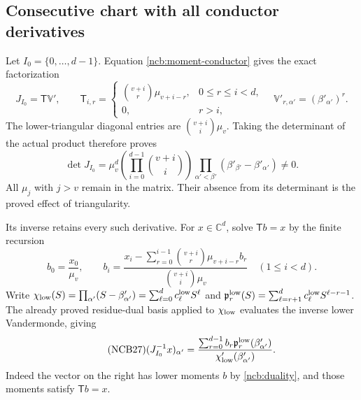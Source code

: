 \subsection{Consecutive chart with all conductor derivatives}
Let $I_0=\{0,\ldots,d-1\}$. Equation \eqref{ncb:moment-conductor}
gives the exact factorization
\begin{equation}\tag{NCB24}\label{ncb:triangular}
J_{I_0}=\mathsf T\mathbb V',\qquad
\mathsf T_{i,r}=
\begin{cases}\binom{v+i}{r}\mu_{v+i-r},&0\leq r\leq i<d,\\
0,&r>i,\end{cases}
\quad \mathbb V'_{r,\alpha'}=(\beta'_{\alpha'})^r .
\end{equation}
The lower-triangular diagonal entries are
$\binom{v+i}{i}\mu_v$. Taking the determinant of the actual product
therefore proves
\begin{equation}\tag{NCB25}\label{ncb:consecutive-det}
\det J_{I_0}
=\mu_v^d\left(\prod_{i=0}^{d-1}\binom{v+i}{i}\right)
 \prod_{\alpha'<\beta'}(\beta'_{\beta'}-\beta'_{\alpha'})\ne0 .
\end{equation}
All $\mu_j$ with $j>v$ remain in the matrix. Their absence from its
determinant is the proved effect of triangularity.

Its inverse retains every such derivative. For $x\in\mathbb C^d$,
solve $\mathsf T b=x$ by the finite recursion
\begin{equation}\tag{NCB26}\label{ncb:triangular-inverse}
b_0=\frac{x_0}{\mu_v},\qquad
b_i=\frac{x_i-\sum_{r=0}^{i-1}
          \binom{v+i}{r}\mu_{v+i-r}b_r}
          {\binom{v+i}{i}\mu_v}\quad(1\leq i<d).
\end{equation}
Write
$\chi_{\rm low}(S)=\prod_{\alpha'}(S-\beta'_{\alpha'})
=\sum_{\ell=0}^{d}c_\ell^{\rm low}S^\ell$
and
$\mathfrak p_r^{\rm low}(S)
=\sum_{\ell=r+1}^{d}c_\ell^{\rm low}S^{\ell-r-1}$.
The already proved residue-dual basis applied to $\chi_{\rm low}$
evaluates the inverse lower Vandermonde, giving
\begin{equation}\tag{NCB27}\label{ncb:full-inverse}
(J_{I_0}^{-1}x)_{\alpha'}
=\frac{\sum_{r=0}^{d-1}b_r\mathfrak p_r^{\rm low}(\beta'_{\alpha'})}
          {\chi_{\rm low}'(\beta'_{\alpha'})}.
\end{equation}
Indeed the vector on the right has lower moments $b$ by
\eqref{ncb:duality}, and those moments satisfy $\mathsf T b=x$.

